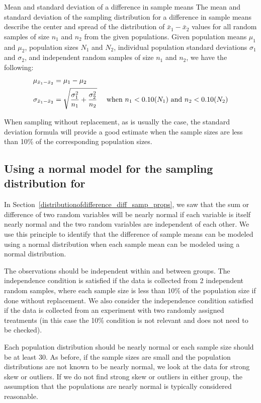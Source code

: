 \begin{onebox}{Mean and standard deviation of a difference in sample means}
The mean and standard deviation of the sampling distribution for a difference in sample means describe the center and spread of the distribution of $\bar{x}_1-\bar{x}_2$ values for all random samples of size $n_1$ and $n_2$ from the given populations.
Given population means $\mu_1$ and $\mu_2$, population sizes $N_1$ and $N_2$, individual population
standard deviations $\sigma_1$ and $\sigma_2$, and independent random samples
of size $n_1$ and $n_2$, we have the following:
\begin{align*}
\mu_{\bar{x}_1 - \bar{x}_2} &= \mu_1 - \mu_2\\
\sigma_{\bar{x}_1 - \bar{x}_2}&=  \sqrt{\frac{\sigma_1^2}{n_1} + \frac{\sigma_2^2}{n_2}}  \quad \text{ when } n_1<0.10(N_1) \text{ and } n_2<0.10(N_2) 
\vspace{1mm}
\end{align*}
\end{onebox}

When sampling without replacement, as is usually the case, the standard deviation formula will provide a good estimate when the sample sizes are less than 10\% of the corresponding population sizes.




\subsection[Using a normal model for the sampling distribution for $\bar{x}_1-\bar{x}_2$]{Using a normal model for the sampling distribution for }
In Section~\ref{distributionofdifference_diff_samp_props},
we saw that the sum or difference of two random variables will be
nearly normal if each variable is itself nearly normal and the two
random variables are independent of each other.
We use this principle to identify that the difference
of sample means can be modeled using a normal distribution when each sample mean can be modeled using a normal distribution.

\begin{description}
\setlength{\itemsep}{0mm}
\item[Independence.]
  The observations should be independent within and between groups.  The independence condition is satisfied if the data is collected from 2 independent random samples, where each sample size is less than 10\% of the population size if done without replacement.  We also consider the independence condition satisfied if the data is collected from an experiment with two randomly assigned treatments (in this case the 10\% condition is not relevant and does not need to be checked).
\item[Large sample / normal population.]
  Each population distribution should be nearly normal
  or each sample size should be at least 30.
  As before, if the sample sizes are small and the population
  distributions are not known to be nearly normal,
  we look at the data for strong skew or outliers.
  If we do not find strong skew or outliers in either group,
  the assumption that the populations are nearly normal is typically considered reasonable.
\end{description}


